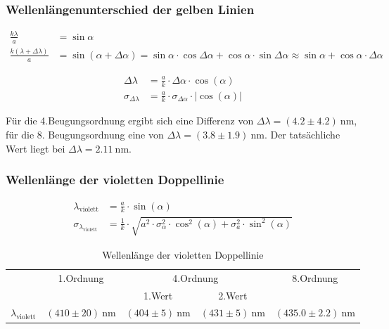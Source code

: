 \documentclass[12pt,a4paper,titlepage,headinclude,bibtotoc]{scrartcl}
\begin{document}
\subsubsection{Wellenlängenunterschied der gelben Linien}
\begin{align}
	\frac{k\lambda}{a}&=\sin\alpha \\
	\frac{k(\lambda+\Delta\lambda)}{a}&=\sin(\alpha+\Delta\alpha) =\sin\alpha\cdot\cos\Delta\alpha +\cos\alpha\cdot\sin\Delta\alpha \approx\sin\alpha+ \cos\alpha\cdot\Delta\alpha
\end{align}

\begin{align}
	\Delta\lambda&=\frac{a}{k} \cdot \Delta \alpha \cdot \cos{\left (\alpha \right )}\\
\sigma_{\Delta\lambda}&=\frac{a}{k} \cdot \sigma_{\Delta \alpha} \cdot \left\lvert{\cos{\left (\alpha \right )}}\right\rvert
\end{align}

Für die 4.Beugungsordnung ergibt sich eine Differenz von $\Delta\lambda=(4.2 \pm 4.2)~$nm, für die 8. Beugungsordnung eine von $\Delta\lambda=(3.8 \pm 1.9)~$nm.
Der tatsächliche Wert liegt bei  $\Delta\lambda=2.11~$nm.

\subsubsection{Wellenlänge der violetten Doppellinie}
\begin{align}
	\lambda_\text{violett}&=\frac{a}{k} \cdot \sin{\left (\alpha \right )}\\
\sigma_{\lambda_\text{violett}}&=\frac{1}{k} \cdot \sqrt{a^{2} \cdot \sigma_{\alpha}^{2} \cdot \cos^{2}{\left (\alpha \right )} + \sigma_{a}^{2} \cdot \sin^{2}{\left (\alpha \right )}}
\end{align}

\begin{table}[!htb]
	\centering
	\begin{tabular}{|c|c|c|c|c|}
		\hline
		& 1.Ordnung & \multicolumn{2}{c|}{4.Ordnung} & 8.Ordnung\\
	    & & 1.Wert & 2.Wert & \\
		\hline
		$\lambda_\text{violett}$ & $(410 \pm 20)~$nm & $(404 \pm 5)~$nm & $(431 \pm 5)~$nm & $(435.0 \pm 2.2)~$nm  \\
		\hline
	\end{tabular}
	\caption{Wellenlänge der violetten Doppellinie}
	\label{tab:violett}
\end{table}
\end{document}
